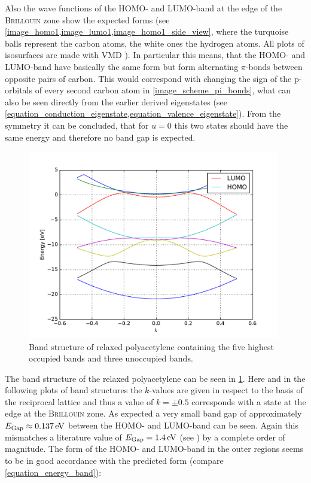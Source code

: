 Also the wave functions of the HOMO- and LUMO-band at the edge of the \textsc{Brillouin} zone show the expected forms (see \cref{image_homo1,image_lumo1,image_homo1_side_view}, where the turquoise balls represent the carbon atoms, the white ones the hydrogen atoms. All plots of isosurfaces are made with VMD \cite{HUMP96}). In particular this means, that the HOMO- and LUMO-band have basically the same form but form alternating $\pi$-bonds between opposite pairs of carbon. This would correspond with changing the sign of the p-orbitals of every second carbon atom in \cref{image_scheme_pi_bonds}, what can also be seen directly from the earlier derived eigenstates (see \cref{equation_conduction_eigenstate,equation_valence_eigenstate}). From the symmetry it can be concluded, that for $u=0$ this two states should have the same energy and therefore no band gap is expected.\\
\begin{figure}
	\centering
	\includegraphics[width = 11cm]{Images/polyacetylene/bands/band_structure}
	\caption{Band structure of relaxed polyacetylene containing the five highest occupied bands and three unoccupied bands.}
	\label{image_band_structure_relaxed_polyacetylene}
\end{figure}
The band structure of the relaxed polyacetylene can be seen in \cref{image_band_structure_relaxed_polyacetylene}. Here and in the following plots of band structures the $k$-values are given in respect to the basis of the reciprocal lattice and thus a value of $k = \pm 0.5$ corresponds with a state at the edge at the \textsc{Brillouin} zone. As expected a very small band gap of approximately $E_\text{Gap} \approx \unit[0.137]{eV}$ between the HOMO- and LUMO-band can be seen. Again this mismatches a literature value of $E_\text{Gap} = \unit[1.4]{eV}$ (see \cite{PhysRevLett.42.1698}) by a complete order of magnitude. The form of the HOMO- and LUMO-band in the outer regions seems to be in good accordance with the predicted form (compare \cref{equation_energy_band}):
